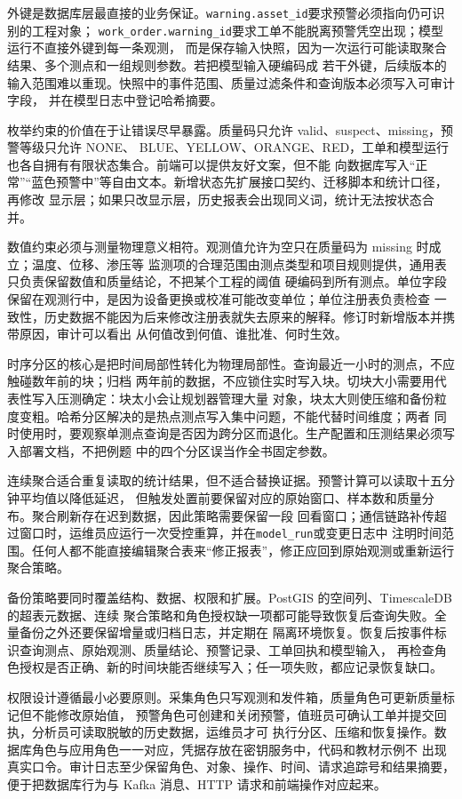 外键是数据库层最直接的业务保证。\texttt{warning.asset\_id}要求预警必须指向仍可识别的工程对象；
\texttt{work\_order.warning\_id}要求工单不能脱离预警凭空出现；模型运行不直接外键到每一条观测，
而是保存输入快照，因为一次运行可能读取聚合结果、多个测点和一组规则参数。若把模型输入硬编码成
若干外键，后续版本的输入范围难以重现。快照中的事件范围、质量过滤条件和查询版本必须写入可审计字段，
并在模型日志中登记哈希摘要。

枚举约束的价值在于让错误尽早暴露。质量码只允许 valid、suspect、missing，预警等级只允许 NONE、
BLUE、YELLOW、ORANGE、RED，工单和模型运行也各自拥有有限状态集合。前端可以提供友好文案，但不能
向数据库写入“正常”“蓝色预警中”等自由文本。新增状态先扩展接口契约、迁移脚本和统计口径，再修改
显示层；如果只改显示层，历史报表会出现同义词，统计无法按状态合并。

数值约束必须与测量物理意义相符。观测值允许为空只在质量码为 missing 时成立；温度、位移、渗压等
监测项的合理范围由测点类型和项目规则提供，通用表只负责保留数值和质量结论，不把某个工程的阈值
硬编码到所有测点。单位字段保留在观测行中，是因为设备更换或校准可能改变单位；单位注册表负责检查
一致性，历史数据不能因为后来修改注册表就失去原来的解释。修订时新增版本并携带原因，审计可以看出
从何值改到何值、谁批准、何时生效。

时序分区的核心是把时间局部性转化为物理局部性。查询最近一小时的测点，不应触碰数年前的块；归档
两年前的数据，不应锁住实时写入块。切块大小需要用代表性写入压测确定：块太小会让规划器管理大量
对象，块太大则使压缩和备份粒度变粗。哈希分区解决的是热点测点写入集中问题，不能代替时间维度；两者
同时使用时，要观察单测点查询是否因为跨分区而退化。生产配置和压测结果必须写入部署文档，不把例题
中的四个分区误当作全书固定参数。

连续聚合适合重复读取的统计结果，但不适合替换证据。预警计算可以读取十五分钟平均值以降低延迟，
但触发处置前要保留对应的原始窗口、样本数和质量分布。聚合刷新存在迟到数据，因此策略需要保留一段
回看窗口；通信链路补传超过窗口时，运维员应运行一次受控重算，并在\texttt{model\_run}或变更日志中
注明时间范围。任何人都不能直接编辑聚合表来“修正报表”，修正应回到原始观测或重新运行聚合策略。

备份策略要同时覆盖结构、数据、权限和扩展。PostGIS 的空间列、TimescaleDB 的超表元数据、连续
聚合策略和角色授权缺一项都可能导致恢复后查询失败。全量备份之外还要保留增量或归档日志，并定期在
隔离环境恢复。恢复后按事件标识查询测点、原始观测、质量结论、预警记录、工单回执和模型输入，
再检查角色授权是否正确、新的时间块能否继续写入；任一项失败，都应记录恢复缺口。

权限设计遵循最小必要原则。采集角色只写观测和发件箱，质量角色可更新质量标记但不能修改原始值，
预警角色可创建和关闭预警，值班员可确认工单并提交回执，分析员可读取脱敏的历史数据，运维员才可
执行分区、压缩和恢复操作。数据库角色与应用角色一一对应，凭据存放在密钥服务中，代码和教材示例不
出现真实口令。审计日志至少保留角色、对象、操作、时间、请求追踪号和结果摘要，便于把数据库行为与
Kafka 消息、HTTP 请求和前端操作对应起来。

